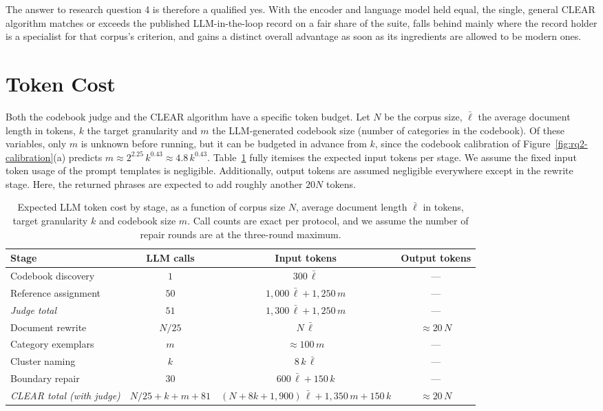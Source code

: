 \documentclass[11pt,a4paper,oneside]{report}
\begin{document}
The answer to research question 4 is therefore a qualified yes. With the encoder and language model held equal, the single, general CLEAR algorithm matches or exceeds the published LLM-in-the-loop record on a fair share of the suite, falls behind mainly where the record holder is a specialist for that corpus's criterion, and gains a distinct overall advantage as soon as its ingredients are allowed to be modern ones.

\section{Token Cost}\label{sec:cost}

Both the codebook judge and the CLEAR algorithm have a specific token budget. Let $N$ be the corpus size, $\bar{\ell}$ the average document length in tokens, $k$ the target granularity and $m$ the LLM-generated codebook size (number of categories in the codebook). Of these variables, only $m$ is unknown before running, but it can be budgeted in advance from $k$, since the codebook calibration of Figure~\ref{fig:rq2-calibration}(a) predicts $m \approx 2^{2.25}\,k^{0.43} \approx 4.8\,k^{0.43}$. Table~\ref{tab:cost} fully itemises the expected input tokens per stage. We assume the fixed input token usage of the prompt templates is negligible. Additionally, 
output tokens are assumed negligible everywhere except in the rewrite stage. Here, the returned phrases are expected to add roughly another $20N$ tokens.

\begin{table}[htbp]
\centering
\small
\begin{tabular}{lccc}
\toprule
Stage & LLM calls & Input tokens & Output tokens \\
\midrule
Codebook discovery & $1$ & $300\,\bar{\ell}$ & --- \\
Reference assignment & $50$ & $1{,}000\,\bar{\ell} + 1{,}250\,m$ & --- \\
\emph{Judge total} & $51$ & $1{,}300\,\bar{\ell} + 1{,}250\,m$ & --- \\
\midrule
Document rewrite & $N/25$ & $N\,\bar{\ell}$ & $\approx 20\,N$ \\
Category exemplars & $m$ & $\approx 100\,m$ & --- \\
Cluster naming & $k$ & $8\,k\,\bar{\ell}$ & --- \\
Boundary repair & $30$ & $600\,\bar{\ell} + 150\,k$ & --- \\
\emph{CLEAR total (with judge)} & $N/25 + k + m + 81$ & $(N + 8k + 1{,}900)\,\bar{\ell} + 1{,}350\,m + 150\,k$ & $\approx 20\,N$ \\
\bottomrule
\end{tabular}
\caption[Expected token cost by stage]{Expected LLM token cost by stage, as a function of corpus size $N$, average document length $\bar{\ell}$ in tokens, target granularity $k$ and codebook size $m$. Call counts are exact per protocol, and we assume the number of repair rounds are at the three-round maximum.}
\label{tab:cost}
\end{table}
\end{document}
